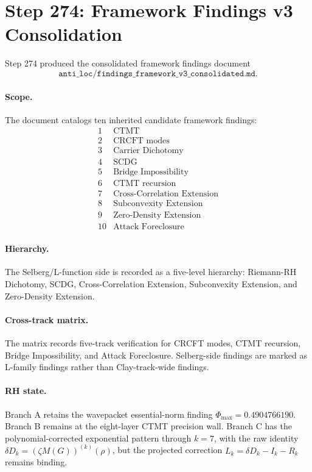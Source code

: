 \section*{Step 274: Framework Findings v3 Consolidation}

Step 274 produced the consolidated framework findings document
\[
\texttt{anti\_loc/findings\_framework\_v3\_consolidated.md}.
\]

\paragraph{Scope.}
The document catalogs ten inherited candidate framework findings:
\[
\begin{array}{rl}
1&\text{CTMT}\\
2&\text{CRCFT modes}\\
3&\text{Carrier Dichotomy}\\
4&\text{SCDG}\\
5&\text{Bridge Impossibility}\\
6&\text{CTMT recursion}\\
7&\text{Cross-Correlation Extension}\\
8&\text{Subconvexity Extension}\\
9&\text{Zero-Density Extension}\\
10&\text{Attack Foreclosure}
\end{array}
\]

\paragraph{Hierarchy.}
The Selberg/L-function side is recorded as a five-level hierarchy:
Riemann-RH Dichotomy, SCDG, Cross-Correlation Extension, Subconvexity
Extension, and Zero-Density Extension.

\paragraph{Cross-track matrix.}
The matrix records five-track verification for CRCFT modes, CTMT recursion,
Bridge Impossibility, and Attack Foreclosure.  Selberg-side findings are marked
as L-family findings rather than Clay-track-wide findings.

\paragraph{RH state.}
Branch A retains the wavepacket essential-norm finding
\(\Phi_{\max}=0.4904766190\). Branch B remains at the eight-layer CTMT
precision wall. Branch C has the polynomial-corrected exponential pattern
through \(k=7\), with the raw identity
\(\delta D_k=(\zeta M(G))^{(k)}(\rho)\), but the projected correction
\(L_k=\delta D_k-I_k-R_k\) remains binding.

